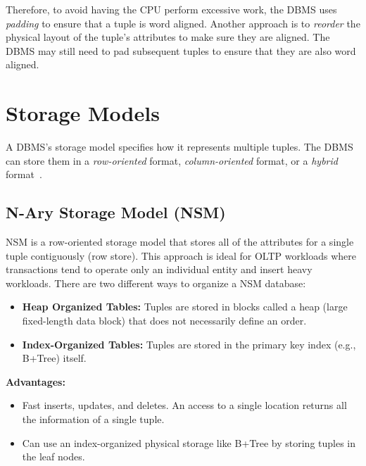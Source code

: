 \documentclass[11pt]{article}
\begin{document}
Therefore, to avoid having the CPU perform excessive work, the DBMS uses \textit{padding} to ensure that a tuple is word aligned. Another approach is to \textit{reorder} the physical layout of the tuple's attributes to make sure they are aligned. The DBMS may still need to pad subsequent tuples to ensure that they are also word aligned.

\section{Storage Models}
A DBMS's storage model specifies how it represents multiple tuples. The DBMS can store them in a \textit{row-oriented} format, \textit{column-oriented} format, or a \textit{hybrid} format~\cite{Abadi}.

\subsection*{N-Ary Storage Model (NSM)}
NSM is a row-oriented storage model that stores all of the attributes for a single tuple contiguously (row store). This approach is ideal for OLTP workloads where transactions tend to operate only an individual entity and insert heavy workloads. There are two different ways to organize a NSM database:
\begin{itemize}
    \item \textbf{Heap Organized Tables:}
    Tuples are stored in blocks called a heap (large fixed-length data block) that does not necessarily define an order.
    
    \item \textbf{Index-Organized Tables:}
    Tuples are stored in the primary key index (e.g., B+Tree) itself.
\end{itemize}

\textbf{Advantages:}
\begin{itemize}
    \item
    Fast inserts, updates, and deletes. An access to a single location returns all the information of a single tuple.
    \item 
    Can use an index-organized physical storage like B+Tree by storing tuples in the leaf nodes.

\end{itemize}
\end{document}
